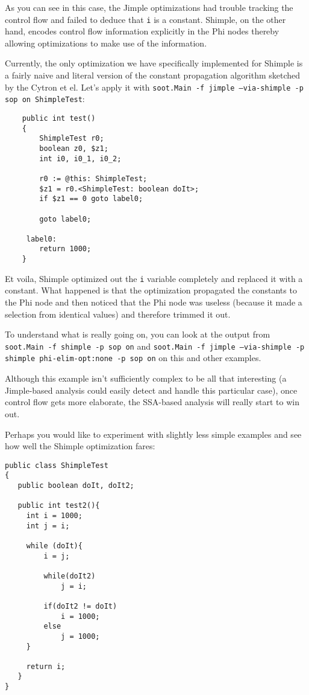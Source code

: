 \documentclass[10pt,letterpaper,oneside,onecolumn]{article}
\begin{document}
As you can see in this case, the Jimple optimizations had trouble
tracking the control flow and failed to deduce that {\tt i} is a
constant.  Shimple, on the other hand, encodes control flow
information explicitly in the Phi nodes thereby allowing optimizations
to make use of the information.

Currently, the only optimization we have specifically implemented for
Shimple is a fairly naive and literal version of the constant
propagation algorithm sketched by the Cytron et el.  Let's apply it
with {\tt soot.Main -f jimple --via-shimple -p sop on ShimpleTest}:

\begin{verbatim}
    public int test()
    {
        ShimpleTest r0;
        boolean z0, $z1;
        int i0, i0_1, i0_2;

        r0 := @this: ShimpleTest;
        $z1 = r0.<ShimpleTest: boolean doIt>;
        if $z1 == 0 goto label0;

        goto label0;

     label0:
        return 1000;
    }
\end{verbatim}

Et voila, Shimple optimized out the {\tt i} variable completely and
replaced it with a constant.  What happened is that the optimization
propagated the constants to the Phi node and then noticed that the
Phi node was useless (because it made a selection from identical
values) and therefore trimmed it out.

To understand what is really going on, you can look at the output from
{\tt soot.Main -f shimple -p sop on} and {\tt soot.Main -f jimple
--via-shimple -p shimple phi-elim-opt:none -p sop on} on this and
other examples.

Although this example isn't sufficiently complex to be all that
interesting (a Jimple-based analysis could easily detect and handle
this particular case), once control flow gets more elaborate, the
SSA-based analysis will really start to win out.  

Perhaps you would like to experiment with slightly less simple 
examples and see how well the Shimple optimization fares:

\begin{verbatim}
public class ShimpleTest
{
   public boolean doIt, doIt2;

   public int test2(){
     int i = 1000;
     int j = i;

     while (doIt){
         i = j;

         while(doIt2)
             j = i;

         if(doIt2 != doIt)
             i = 1000;
         else
             j = 1000;
     }

     return i;
   }
}
\end{verbatim}
\end{document}
